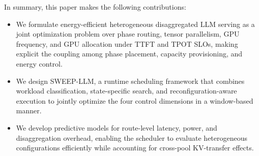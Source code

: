 In summary, this paper makes the following contributions:
\begin{itemize}
    \item We formulate energy-efficient heterogeneous disaggregated LLM serving as a joint optimization problem over phase routing, tensor parallelism, GPU frequency, and GPU allocation under TTFT and TPOT SLOs, making explicit the coupling among phase placement, capacity provisioning, and energy control.

    \item We design SWEEP-LLM, a runtime scheduling framework that combines workload classification, state-specific search, and reconfiguration-aware execution to jointly optimize the four control dimensions in a window-based manner. 

    \item We develop predictive models for route-level latency, power, and disaggregation overhead, enabling the scheduler to evaluate heterogeneous configurations efficiently while accounting for cross-pool KV-transfer effects.


\end{itemize}
